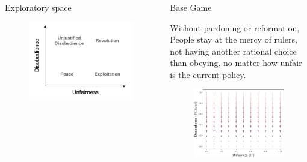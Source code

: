 \documentclass[xcolor={table}]{beamer}
\begin{document}
\begin{frame}[fragile=singleslide,t]
\begin{columns}[T]
\begin{column}{.42\textwidth}
\begin{block}{Exploratory space}
\begin{figure}
  \centering
  \includegraphics[width=0.8\linewidth]{img/space_disob.pdf} 
\end{figure}
\end{block} 

\end{column}
\begin{column}{.58\textwidth}


\begin{block}{Base Game}

Without pardoning or reformation, People stay at the mercy of rulers, not having another rational choice than obeying, no matter how unfair is the current policy.


\begin{figure}
  \centering
  \includegraphics[width=0.55\linewidth]{img/phasebase-crop.pdf} 
\end{figure}


\end{block}
\end{column}
\end{columns}
\end{frame}
\end{document}
